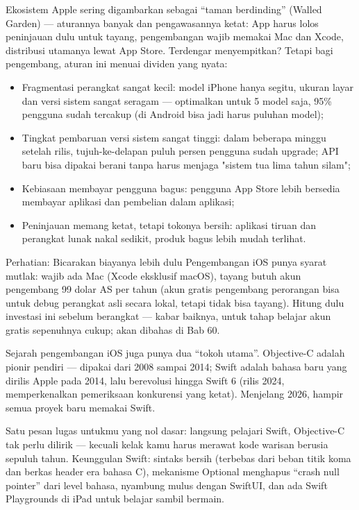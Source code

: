 
Ekosistem Apple sering digambarkan sebagai “taman berdinding” (Walled Garden) — aturannya banyak dan pengawasannya ketat: App harus lolos peninjauan dulu untuk tayang, pengembangan wajib memakai Mac dan Xcode, distribusi utamanya lewat App Store. Terdengar menyempitkan? Tetapi bagi pengembang, aturan ini menuai dividen yang nyata:

\begin{itemize}
  \item Fragmentasi perangkat sangat kecil: model iPhone hanya segitu, ukuran layar dan versi sistem sangat seragam — optimalkan untuk 5 model saja, 95\% pengguna sudah tercakup (di Android bisa jadi harus puluhan model);
  \item Tingkat pembaruan versi sistem sangat tinggi: dalam beberapa minggu setelah rilis, tujuh-ke-delapan puluh persen pengguna sudah upgrade; API baru bisa dipakai berani tanpa harus menjaga "sistem tua lima tahun silam";
  \item Kebiasaan membayar pengguna bagus: pengguna App Store lebih bersedia membayar aplikasi dan pembelian dalam aplikasi;
  \item Peninjauan memang ketat, tetapi tokonya bersih: aplikasi tiruan dan perangkat lunak nakal sedikit, produk bagus lebih mudah terlihat.
\end{itemize}

\begin{tcbwarn}{Perhatian: Bicarakan biayanya lebih dulu}
Pengembangan iOS punya syarat mutlak: wajib ada Mac (Xcode eksklusif macOS), tayang butuh akun pengembang 99 dolar AS per tahun (akun gratis pengembang perorangan bisa untuk debug perangkat asli secara lokal, tetapi tidak bisa tayang). Hitung dulu investasi ini sebelum berangkat — kabar baiknya, untuk tahap belajar akun gratis sepenuhnya cukup; akan dibahas di Bab 60.

\end{tcbwarn}


Sejarah pengembangan iOS juga punya dua “tokoh utama”. Objective-C adalah pionir pendiri — dipakai dari 2008 sampai 2014; Swift adalah bahasa baru yang dirilis Apple pada 2014, lalu berevolusi hingga Swift 6 (rilis 2024, memperkenalkan pemeriksaan konkurensi yang ketat). Menjelang 2026, hampir semua proyek baru memakai Swift.

Satu pesan lugas untukmu yang nol dasar: langsung pelajari Swift, Objective-C tak perlu dilirik — kecuali kelak kamu harus merawat kode warisan berusia sepuluh tahun. Keunggulan Swift: sintaks bersih (terbebas dari beban titik koma dan berkas header era bahasa C), mekanisme Optional menghapus “crash null pointer” dari level bahasa, nyambung mulus dengan SwiftUI, dan ada Swift Playgrounds di iPad untuk belajar sambil bermain.

